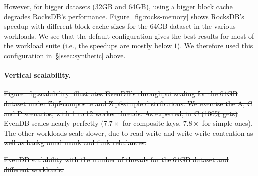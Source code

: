\documentclass[sigplan,10pt]{acmart}
\newcommand{\sys}{EvenDB}
\providecommand{\DIFdel}[1]{{\protect\color{red}\sout{#1}}}                      %
\providecommand{\DIFdelbegin}{} %
\providecommand{\DIFdelFL}[1]{\DIFdel{#1}} %
\begin{document}
However, for  bigger datasets (32GB and 64GB),   using a  bigger 
block cache degrades  RocksDB's performance. Figure~\ref{fig:rocks-memory} shows 
RocksDB's speedup with different block cache sizes for the 64GB dataset in the various workloads. 
We see that the default configuration gives the best results for most of the workload suite (i.e., the 
speedups are mostly below $1$). We therefore used this configuration  in~\S\ref{ssec:synthetic} above.   




  

\DIFdelbegin \paragraph{\DIFdel{Vertical scalability.}} 
\addtocounter{paragraph}{-1}%
\DIFdel{Figure~\ref{fig:scalability} illustrates \sys's throughput scaling for the 64GB dataset under Zipf-composite and Zipf-simple  
distributions. We exercise the A, C and P scenarios, with 1 to 12 worker threads.  
As expected, in C (100\% gets) \sys\/ scales nearly perfectly ($7.7\times$ for composite keys, $7.8\times$ for simple ones). 
The other workloads scale slower, due to read-write and write-write contention as well as background munk and funk rebalances. 
}%


{%
\DIFdelFL{\sys\/ scalability with the number of threads for 
the 64GB dataset and different workloads. }%
}
\end{document}
